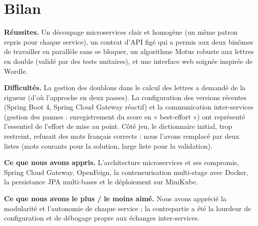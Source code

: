 \documentclass[11pt,a4paper]{article}
\begin{document}
\section{Bilan}
\textbf{Réussites.} Un découpage microservices clair et homogène (un même patron repris
pour chaque service), un contrat d'API figé qui a permis aux deux binômes de travailler
en parallèle sans se bloquer, un algorithme Motus robuste aux lettres en double (validé
par des tests unitaires), et une interface web soignée inspirée de Wordle.

\textbf{Difficultés.} La gestion des doublons dans le calcul des lettres a demandé de la
rigueur (d'où l'approche en deux passes). La configuration des versions récentes
(Spring Boot 4, Spring Cloud Gateway réactif) et la communication inter-services
(gestion des pannes : enregistrement du score en « best-effort ») ont représenté
l'essentiel de l'effort de mise au point. Côté jeu, le dictionnaire initial, trop
restreint, refusait des mots français corrects : nous l'avons remplacé par deux listes
(mots courants pour la solution, large liste pour la validation).

\textbf{Ce que nous avons appris.} L'architecture microservices et ses compromis,
Spring Cloud Gateway, OpenFeign, la conteneurisation multi-stage avec Docker, la
persistance JPA multi-bases et le déploiement sur MiniKube.

\textbf{Ce que nous avons le plus / le moins aimé.} Nous avons apprécié la modularité et
l'autonomie de chaque service ; la contrepartie a été la lourdeur de configuration et de
débogage propre aux échanges inter-services.
\end{document}
